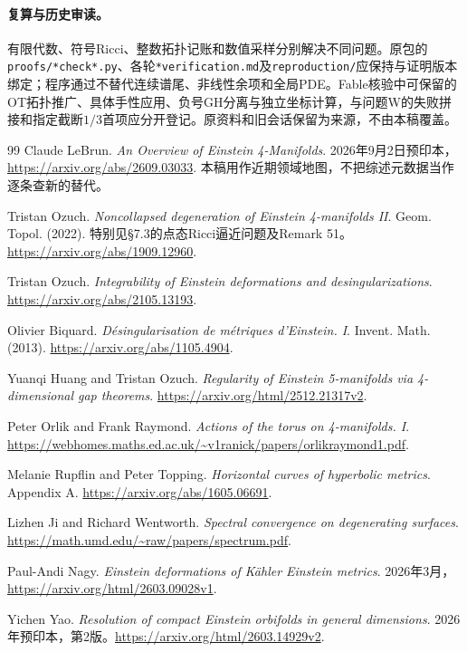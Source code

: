 \documentclass[UTF8,fontset=fandol,zihao=-4]{ctexart}
\theoremstyle{cn}
\begin{document}
\paragraph{复算与历史审读。}
有限代数、符号Ricci、整数拓扑记账和数值采样分别解决不同问题。原包的\nolinkurl{proofs/*check*.py}、各轮\nolinkurl{*verification.md}及\nolinkurl{reproduction/}应保持与证明版本绑定；程序通过不替代连续谱尾、非线性余项和全局PDE。Fable核验中可保留的OT拓扑推广、具体手性应用、负号GH分离与独立坐标计算，与问题W的失败拼接和指定截断$1/3$首项应分开登记。原资料和旧会话保留为来源，不由本稿覆盖。
\begin{thebibliography}{99}
 Claude LeBrun. \emph{An Overview of Einstein 4-Manifolds}. 2026年9月2日预印本，\url{https://arxiv.org/abs/2609.03033}. 本稿用作近期领域地图，不把综述元数据当作逐条查新的替代。

 Tristan Ozuch. \emph{Noncollapsed degeneration of Einstein 4-manifolds II}. Geom. Topol. (2022). 特别见\S7.3的点态Ricci逼近问题及Remark 51。\url{https://arxiv.org/abs/1909.12960}.

 Tristan Ozuch. \emph{Integrability of Einstein deformations and desingularizations}. \url{https://arxiv.org/abs/2105.13193}.

 Olivier Biquard. \emph{Désingularisation de métriques d’Einstein. I}. Invent. Math. (2013). \url{https://arxiv.org/abs/1105.4904}.

 Yuanqi Huang and Tristan Ozuch. \emph{Regularity of Einstein 5-manifolds via 4-dimensional gap theorems}. \url{https://arxiv.org/html/2512.21317v2}.

 Peter Orlik and Frank Raymond. \emph{Actions of the torus on 4-manifolds. I}. \url{https://webhomes.maths.ed.ac.uk/~v1ranick/papers/orlikraymond1.pdf}.

 Melanie Rupflin and Peter Topping. \emph{Horizontal curves of hyperbolic metrics}. Appendix A. \url{https://arxiv.org/abs/1605.06691}.

 Lizhen Ji and Richard Wentworth. \emph{Spectral convergence on degenerating surfaces}. \url{https://math.umd.edu/~raw/papers/spectrum.pdf}.

 Paul-Andi Nagy. \emph{Einstein deformations of Kähler Einstein metrics}. 2026年3月，\url{https://arxiv.org/html/2603.09028v1}.

 Yichen Yao. \emph{Resolution of compact Einstein orbifolds in general dimensions}. 2026年预印本，第2版。\url{https://arxiv.org/html/2603.14929v2}.


\end{thebibliography}
\end{document}
